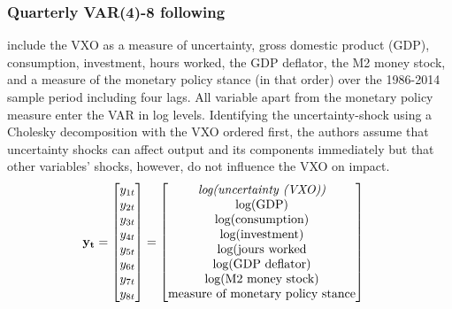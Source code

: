 \documentclass[a4paper,11pt,listof=nochaptergap,oneside,pointednumbers,bibtotoc,bigheadings,liststotoc,hidelinks]{scrbook}
\theoremstyle{mysatz}
\theoremstyle{mydefinition}
\theoremstyle{mytheorem}
\theoremstyle{mybemerkung}
\newcommand{\vect}[1]{\boldsymbol{\mathbf{#1}}}
\begin{document}
\subsubsection{Quarterly VAR(4)-8 following \citet{basuandbundick:17}}
\citet{basuandbundick:17} include the VXO as a measure of uncertainty, gross domestic product (GDP), consumption, investment, hours worked, the GDP deflator, the M2 money stock, and a measure of the monetary policy stance (in that order) over the 1986-2014 sample period including four lags. All variable apart from the monetary policy measure enter the VAR in log levels. Identifying the uncertainty-shock using a Cholesky decomposition with the VXO ordered first, the authors assume that uncertainty shocks can affect output and its components immediately but that other variables' shocks, however, do not influence the VXO on impact. 
\begin{equation} \label{eq:VAR22}
\begin{split}
\vect{y_t} & = 
 \begin{bmatrix} 
 		y_{1t} \\
		y_{2t} \\
		y_{3t} \\
		y_{4t} \\
		y_{5t} \\
		y_{6t} \\
		y_{7t} \\
		y_{8t} 
	      \end{bmatrix} = 	      
	      \begin{bmatrix} \text{\textit{log(uncertainty (VXO))}} \\ 
				      \text{log(GDP)}\\ 
				      \text{log(consumption)}\\
				      \text{log(investment)}\\ 
				      \text{log(jours worked}\\
				      \text{log(GDP deflator)}\\
				      \text{log(M2 money stock)} \\
				      \text{measure of monetary policy stance}
	      \end{bmatrix}
\end{split}
\end{equation}
\end{document}
